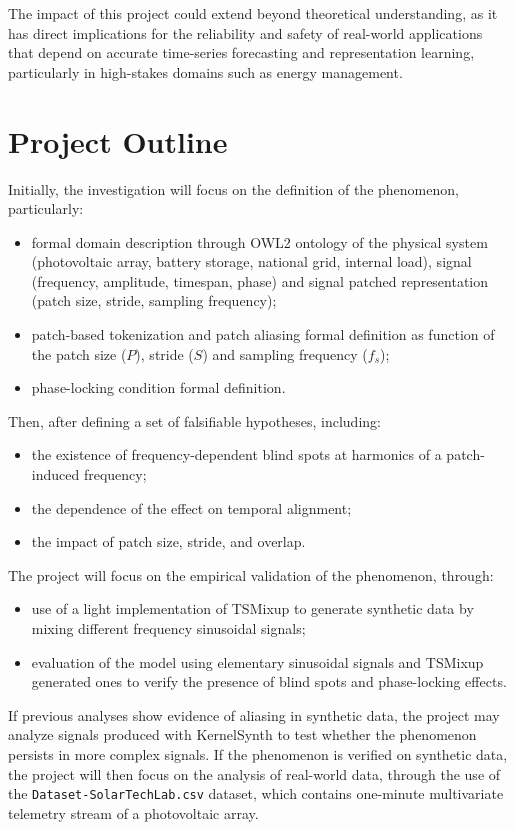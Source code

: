 The impact of this project could extend beyond theoretical understanding, as it has direct implications for the reliability and safety of real-world applications that depend on accurate time-series forecasting and representation learning, particularly in high-stakes domains such as energy management.

\section{Project Outline}
Initially, the investigation will focus on the definition of the phenomenon, particularly:
\begin{itemize}
    \item formal domain description through OWL2 ontology of the physical system (photovoltaic array, battery storage, national grid, internal load), signal (frequency, amplitude, timespan, phase) and signal patched representation (patch size, stride, sampling frequency);
    \item patch-based tokenization and patch aliasing formal definition as function of the patch size ($P$), stride ($S$) and sampling frequency ($f_s$);
    \item phase-locking condition formal definition.
\end{itemize}

Then, after defining a set of falsifiable hypotheses, including:
\begin{itemize}
    \item the existence of frequency-dependent blind spots at harmonics of a patch-induced frequency;
    \item the dependence of the effect on temporal alignment;
    \item the impact of patch size, stride, and overlap.
\end{itemize}

The project will focus on the empirical validation of the phenomenon, through:
\begin{itemize}
    \item use of a light implementation of TSMixup \cite{ansariChronosLearningLanguage2024} to generate synthetic data by mixing different frequency sinusoidal signals;
    \item evaluation of the model using elementary sinusoidal signals and TSMixup generated ones to verify the presence of blind spots and phase-locking effects. 
\end{itemize}

If previous analyses show evidence of aliasing in synthetic data, the project may analyze signals produced with KernelSynth \cite{ansariChronosLearningLanguage2024} to test whether the phenomenon persists in more complex signals. If the phenomenon is verified on synthetic data, the project will then focus on the analysis of real-world data, through the use of the \texttt{Dataset-SolarTechLab.csv} dataset, which contains one-minute multivariate telemetry stream of a photovoltaic array. \cite{levaPhotovoltaicPowerWeather2020}

